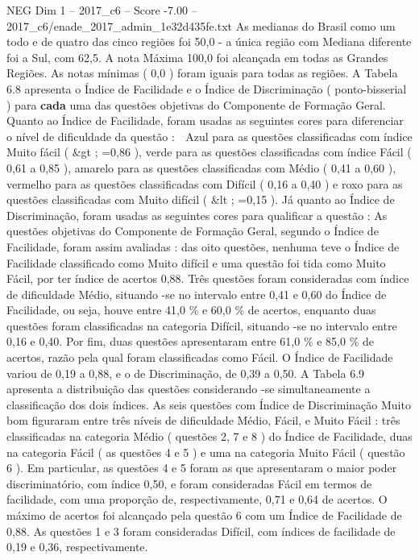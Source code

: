 \begin{textsample}{NEG Dim 1 – 2017\_c6 – Score -7.00 – 2017\_c6/enade\_2017\_admin\_1e32d435fe.txt}
As medianas do Brasil como um todo e de quatro das cinco regiões foi 50,0 - a única região com Mediana diferente foi a Sul, com 62,5.
A nota Máxima 100,0 foi alcançada em todas as Grandes Regiões.
As notas mínimas ( 0,0 ) foram iguais para todas as regiões.
A Tabela 6.8 apresenta o Índice de Facilidade e o Índice de Discriminação ( ponto-bisserial ) para \textbf{cada} uma das questões objetivas do Componente de Formação Geral.
Quanto ao Índice de Facilidade, foram usadas as seguintes cores para diferenciar o nível de dificuldade da questão :  Azul para as questões classificadas com índice Muito fácil ( \&gt ; =0,86 ), verde para as questões classificadas com índice Fácil ( 0,61 a 0,85 ), amarelo para as questões classificadas com Médio ( 0,41 a 0,60 ), vermelho para as questões classificadas com Difícil ( 0,16 a 0,40 ) e roxo para as questões classificadas com Muito difícil ( \&lt ; =0,15 ).
Já quanto ao Índice de Discriminação, foram usadas as seguintes cores para qualificar a questão : As questões objetivas do Componente de Formação Geral, segundo o Índice de Facilidade, foram assim avaliadas : das oito questões, nenhuma teve o Índice de Facilidade classificado como Muito difícil e uma questão foi tida como Muito Fácil, por ter índice de acertos 0,88.
Três questões foram consideradas com índice de dificuldade Médio, situando -se no intervalo entre 0,41 e 0,60 do Índice de Facilidade, ou seja, houve entre 41,0 \% e 60,0 \% de acertos, enquanto duas questões foram classificadas na categoria Difícil, situando -se no intervalo entre 0,16 e 0,40.
Por fim, duas questões apresentaram entre 61,0 \% e 85,0 \% de acertos, razão pela qual foram classificadas como Fácil.
O Índice de Facilidade variou de 0,19 a 0,88, e o de Discriminação, de 0,39 a 0,50.
A Tabela 6.9 apresenta a distribuição das questões considerando -se simultaneamente a classificação dos dois índices.
As seis questões com Índice de Discriminação Muito bom figuraram entre três níveis de dificuldade Médio, Fácil, e Muito Fácil : três classificadas na categoria Médio ( questões 2, 7 e 8 ) do Índice de Facilidade, duas na categoria Fácil ( as questões 4 e 5 ) e uma na categoria Muito Fácil ( questão 6 ).
Em particular, as questões 4 e 5 foram as que apresentaram o maior poder discriminatório, com índice 0,50, e foram consideradas Fácil em termos de facilidade, com uma proporção de, respectivamente, 0,71 e 0,64 de acertos.
O máximo de acertos foi alcançado pela questão 6 com um Índice de Facilidade de 0,88.
As questões 1 e 3 foram consideradas Difícil, com índices de facilidade de 0,19 e 0,36, respectivamente.

\end{textsample}
